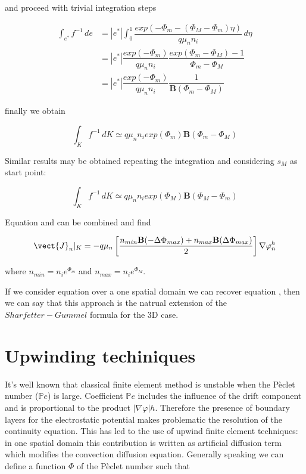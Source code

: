 and proceed with trivial integration steps

\begin{align*}
\int_{e^*} f^{-1} \, de & = |e^*| \int_0^1 \dfrac{exp \left(-\Phi_m - (\Phi_M-\Phi_m)\eta \right)}{q\mu_n n_i} 
 \, d\eta \\
  & = |e^*|\dfrac{exp (-\Phi_m)}{q\mu_n n_i} \dfrac{exp ( \Phi_m-\Phi_M)-1}{\Phi_m-\Phi_M} \\
 & =  |e^*|\dfrac{exp (-\Phi_m)}{q\mu_n n_i} \dfrac{1}{\mathbf{B}(\Phi_m-\Phi_M)}
\end{align*}

finally we obtain

\begin{equation}
\label{eq: finally approzimation 3D to 1D}
\int_{K} f^{-1} \, dK \simeq  q \mu_n n_i exp(\Phi_m) \mathbf{B}(\Phi_m-\Phi_M)
\end{equation}

Similar results may be obtained repeating the integration and considering $s_M$ as start point:

\begin{equation}
\label{eq: approssimazione sm}
\int_{K} f^{-1} \, dK \simeq  q \mu_n n_i exp(\Phi_M) \mathbf{B}(\Phi_M-\Phi_m)
\end{equation}

Equation  and  can be combined and find

\begin{equation}
\label{eq: first formula for J}
\vect{J}_n|_K = -  q \mu_n  \left[ \dfrac{ n_{min} \mathbf{B}(-\Delta \Phi_{max})  + n_{max}\mathbf{B}(\Delta \Phi_{max})}{2} \right]\nabla \varphi_n^h
\end{equation}

where $n_{min}=n_i e^{\Phi_m}$ and $n_{max}=n_i e^{\Phi_M}$.

If we consider equation  over a one spatial domain we can recover equation , then we can say that this approach is the natrual extension of the $Sharfetter-Gummel$ formula for the 3D case.




\section{Upwinding techiniques}

It's well known that classical finite element method is unstable when the P\`eclet number ($\mathbb{P}e$) is large. Coefficient $\mathbb{P}e$ includes the influence of the drift component and is proportional to the product $|\nabla \varphi| h$. Therefore the presence of boundary layers for the electrostatic potential makes problematic the resolution of the continuity equation. This has led to the use of upwind finite element techniques: in one spatial domain this contribution is written as artificial diffusion term which modifies the convection diffusion equation. Generally speaking we can define a function $\Phi$ of the P\`eclet number such that


